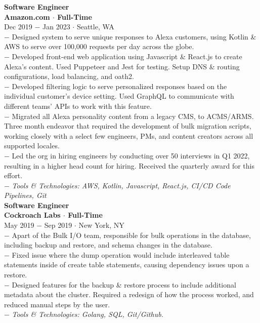 \documentclass{resume}
\begin{document}
\begin{flushleft}
\newpage
\normalsize{\bf Software Engineer}\\
\footnotesize{\bf Amazon.com $\cdot$ Full-Time}\\
\footnotesize{Dec 2019 $-$ Jan 2023 $\cdot$ Seattle, WA}\\[1mm]
{\scriptsize
	$-$ Designed system to serve unique responses to Alexa customers, using Kotlin \& AWS to serve over 100,000 requests per day across the globe. \\
	$-$ Developed front-end web application using Javascript \& React.js to create Alexa's content. Used Puppeteer and Jest for testing. Setup DNS \& routing configurations, load balancing, and oath2. \\
	$-$ Developed filtering logic to serve personalized responses based on the individual customer's device setting. Used GraphQL to communicate with different teams' APIs to work with this feature. \\
	$-$ Migrated all Alexa personality content from a legacy CMS, to ACMS/ARMS. Three month endeavor that required the development of bulk migration scripts, working closely with a select few engineers, PMs, and content creators across all supported locales. \\
	$-$ Led the org in hiring engineers by conducting over 50 interviews in Q1 2022, resulting in a higher head count for hiring. Received the quarterly award for this effort. \\
	$-$ \textit{Tools \& Technologies: AWS, Kotlin, Javascript, React.js, CI/CD Code Pipelines, Git}
}\\[3mm]

\normalsize{\bf Software Engineer}\\
\footnotesize{\bf Cockroach Labs $\cdot$ Full-Time}\\
\footnotesize{May 2019  $-$ Sep 2019 $\cdot$ New York, NY}\\[1mm]
{\scriptsize
	$-$ Apart of the Bulk I/O team, responsible for bulk operations in the database, including backup and restore, and schema changes in the database. \\
	$-$ Fixed issue where the dump operation would include interleaved table statements inside of create table statements, causing dependency issues upon a restore. \\
	$-$ Designed features for the backup \& restore process to include additional metadata about the cluster. Required a redesign of how the process worked, and reduced manual steps by the user. \\
	$-$ \textit{Tools \& Technologies: Golang, SQL, Git/Github.}\\[3mm]
}


\end{flushleft}
\end{document}
